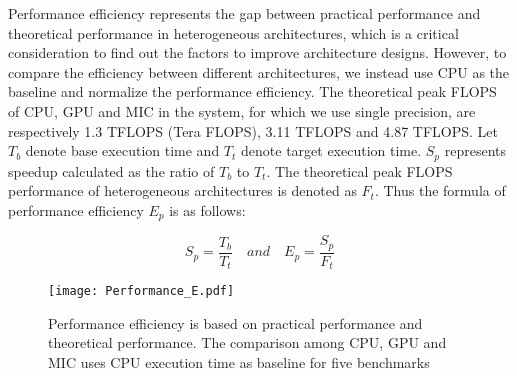 
  
  
Performance efficiency represents the gap between practical performance and theoretical performance in heterogeneous architectures, which is a critical consideration to find out the factors to improve architecture designs. 
However, to compare the efficiency between different architectures, we instead use CPU as 
the baseline and normalize the performance efficiency. 
The theoretical peak FLOPS of CPU, GPU and MIC in the system, for which we use single precision, 
are respectively 1.3 TFLOPS (Tera FLOPS), 3.11 TFLOPS and 4.87 TFLOPS. 
Let $T_{b}$ denote base execution time and $T_{t}$ denote target execution time. $S_{p}$ represents speedup calculated as the ratio of $T_{b}$ to $T_{t}$. The theoretical peak FLOPS performance of heterogeneous architectures is denoted as $F_{t}$. Thus the formula of performance efficiency $E_{p}$ is as follows:

\begin{equation}\label{equ:new_speedup}
	{S_{p}} = \frac{T_{b}}{T_{t}} \quad and \quad {E_{p}} = \frac{S_{p}}{F_{t}}
\end{equation}

      \begin{figure}[h!]
  \centering
  \begin{minipage}{0.5\textwidth}
    \centering
   \centering
     \texttt{[image: Performance\_E.pdf]}  
\caption{Performance efficiency is based on practical performance and theoretical performance. The comparison among CPU, GPU and MIC uses CPU execution time as baseline for five benchmarks}
\label{fig:performanceE}
\end{minipage}%
\end{figure}
  
